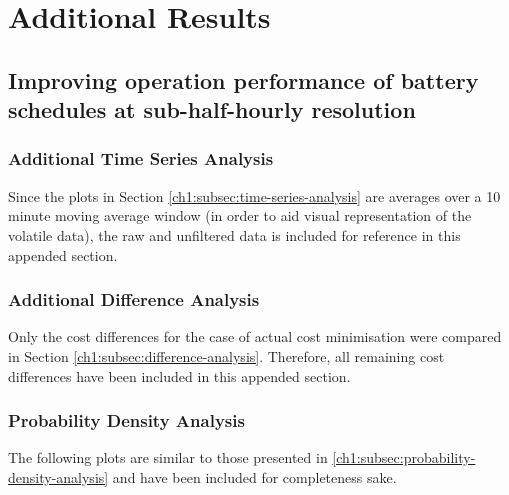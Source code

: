 \chapter{Additional Results}
\label{appx-a:additional-results}

\section{Improving operation performance of battery schedules at sub-half-hourly resolution}
\label{appx-a:ch1}

\subsection{Additional Time Series Analysis}
\label{appx-a:ch1:additional-time-series-analysis}

Since the plots in Section \ref{ch1:subsec:time-series-analysis} are averages over a 10 minute moving average window (in order to aid visual representation of the volatile data), the raw and unfiltered data is included for reference in this appended section.



\subsection{Additional Difference Analysis}
\label{appx-a:ch1:additional-difference-analysis}

Only the cost differences for the case of actual cost minimisation were compared in Section \ref{ch1:subsec:difference-analysis}.
Therefore, all remaining cost differences have been included in this appended section.



\subsection{Probability Density Analysis}

The following plots are similar to those presented in \ref{ch1:subsec:probability-density-analysis} and have been included for completeness sake.

